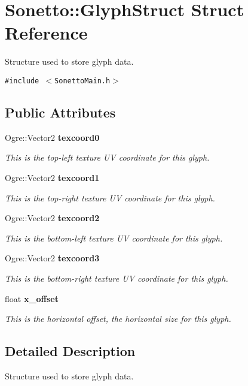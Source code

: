 \section{Sonetto::GlyphStruct Struct Reference}
\label{struct_sonetto_1_1_glyph_struct}
Structure used to store glyph data.  


{\tt \#include $<$SonettoMain.h$>$}

\subsection*{Public Attributes}
\begin{CompactItemize}
\item 
Ogre::Vector2 {\bf texcoord0}
\begin{CompactList}\small\item\em This is the top-left texture UV coordinate for this glyph. \item\end{CompactList}\item 
Ogre::Vector2 {\bf texcoord1}
\begin{CompactList}\small\item\em This is the top-right texture UV coordinate for this glyph. \item\end{CompactList}\item 
Ogre::Vector2 {\bf texcoord2}
\begin{CompactList}\small\item\em This is the bottom-left texture UV coordinate for this glyph. \item\end{CompactList}\item 
Ogre::Vector2 {\bf texcoord3}
\begin{CompactList}\small\item\em This is the bottom-right texture UV coordinate for this glyph. \item\end{CompactList}\item 
float {\bf x\_\-offset}
\begin{CompactList}\small\item\em This is the horizontal offset, the horizontal size for this glyph. \item\end{CompactList}\end{CompactItemize}


\subsection{Detailed Description}
Structure used to store glyph data. 

